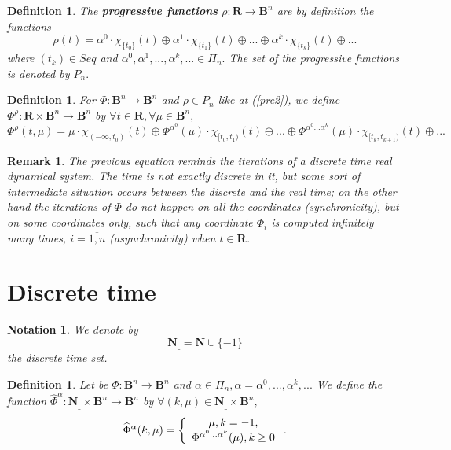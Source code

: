 \documentclass[12pt]{article}\usepackage{amsmath}
\newtheorem{definition}[theorem]{Definition}
\newtheorem{notation}[theorem]{Notation}
\newtheorem{remark}[theorem]{Remark}
\begin{document}
\begin{definition}
The \textbf{progressive functions} $\rho:\mathbf{R}\rightarrow\mathbf{B}^{n}$
are by definition the functions\begin{equation}
\rho(t)=\alpha^{0}\cdot\chi_{\{t_{0}\}}(t)\oplus\alpha^{1}\cdot\chi
_{\{t_{1}\}}(t)\oplus...\oplus\alpha^{k}\cdot\chi_{\{t_{k}\}}(t)\oplus...
\label{pre2}\end{equation}
where $(t_{k})\in Seq$ and $\alpha^{0},\alpha^{1},...,\alpha^{k},...\in\Pi
_{n}.$ The set of the progressive functions is denoted by $P_{n}.$
\end{definition}

\begin{definition}
\label{Def20}For $\Phi:\mathbf{B}^{n}\rightarrow\mathbf{B}^{n}$ and $\rho\in
P_{n}$ like at (\ref{pre2}), we define $\Phi^{\rho}:\mathbf{R}\times
\mathbf{B}^{n}\rightarrow\mathbf{B}^{n}$ by $\forall t\in\mathbf{R},\forall
\mu\in\mathbf{B}^{n},$\[
\Phi^{\rho}(t,\mu)=\mu\cdot\chi_{(-\infty,t_{0})}(t)\oplus\Phi^{\alpha^{0}}(\mu)\cdot\chi_{\lbrack t_{0},t_{1})}(t)\oplus...\oplus\Phi^{\alpha
^{0}...\alpha^{k}}(\mu)\cdot\chi_{\lbrack t_{k},t_{k+1})}(t)\oplus...
\]

\end{definition}

\begin{remark}
The previous equation reminds the iterations of a discrete time real dynamical
system. The time is not exactly discrete in it, but some sort of intermediate
situation occurs between the discrete and the real time; on the other hand the
iterations of $\Phi$ do not happen on all the coordinates (synchronicity), but
on some coordinates only, such that any coordinate $\Phi_{i}$ is computed
infinitely many times, $i=\overline{1,n}$ (asynchronicity) when $t\in
\mathbf{R}$.
\end{remark}

\section{Discrete time}

\begin{notation}
We denote by\[
\mathbf{N}_{\_}=\mathbf{N}\cup\{-1\}
\]
the discrete time set.
\end{notation}

\begin{definition}
Let be $\Phi:\mathbf{B}^{n}\rightarrow\mathbf{B}^{n}$ and $\alpha\in\Pi
_{n},\alpha=\alpha^{0},...,\alpha^{k},...$ We define the function
$\widehat{\Phi}^{\alpha}:\mathbf{N}_{\_}\times\mathbf{B}^{n}\rightarrow
\mathbf{B}^{n}$ by $\forall(k,\mu)\in\mathbf{N}_{\_}\times\mathbf{B}^{n}, $\[
\widehat{\Phi}^{\alpha}(k,\mu)=\left\{
\begin{array}
[c]{c}\mu,k=-1,\\
\Phi^{\alpha^{0}...\alpha^{k}}(\mu),k\geq0
\end{array}
\right.  .
\]

\end{definition}
\end{document}
